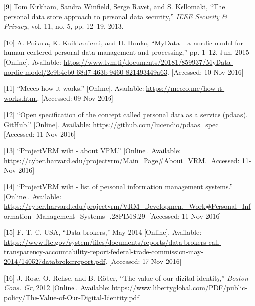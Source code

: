 \documentclass[12pt,english,a4paper,titlepage,cleardoublepage=empty,dottedtoc]{report}
\begin{document}
\hypertarget{ref-paper_2013_the-personal-data-store-approach-to-personal-data-security_2013}{}
{[}9{]} Tom Kirkham, Sandra Winfield, Serge Ravet, and S. Kellomaki,
``The personal data store approach to personal data security,''
\emph{IEEE Security \& Privacy}, vol. 11, no. 5, pp. 12--19, 2013.

\hypertarget{ref-whitepaper_2014_mydata-a-nordic-model-for-human-centered-personal-data-management-and-processing}{}
{[}10{]} A. Poikola, K. Kuikkaniemi, and H. Honko, ``MyData -- a nordic
model for human-centered personal data management and processing,'' pp.
1--12, Jun. 2015 {[}Online{]}. Available:
\url{https://www.lvm.fi/documents/20181/859937/MyData-nordic-model/2e9b4eb0-68d7-463b-9460-821493449a63}.
{[}Accessed: 10-Nov-2016{]}

\hypertarget{ref-web_2016_meeco-how-it-works}{}
{[}11{]} ``Meeco how it works.'' {[}Online{]}. Available:
\url{https://meeco.me/how-it-works.html}. {[}Accessed: 09-Nov-2016{]}

\hypertarget{ref-repo_2016_pdaas-spec}{}
{[}12{]} ``Open specification of the concept called personal data as a
service (pdaas). GitHub.'' {[}Online{]}. Available:
\url{https://github.com/lucendio/pdaas_spec}. {[}Accessed:
11-Nov-2016{]}

\hypertarget{ref-web_2010_projectvrm-wiki_about-vrm}{}
{[}13{]} ``ProjectVRM wiki - about VRM.'' {[}Online{]}. Available:
\url{https://cyber.harvard.edu/projectvrm/Main_Page\#About_VRM}.
{[}Accessed: 11-Nov-2016{]}

\hypertarget{ref-web_2010_projectvrm-wiki_pims-example-list}{}
{[}14{]} ``ProjectVRM wiki - list of personal information management
systems.'' {[}Online{]}. Available:
\url{https://cyber.harvard.edu/projectvrm/VRM_Development_Work\#Personal_Information_Management_Systems_.28PIMS.29}.
{[}Accessed: 11-Nov-2016{]}

\hypertarget{ref-report_2014_data-brokers}{}
{[}15{]} F. T. C. USA, ``Data brokers,'' May 2014 {[}Online{]}.
Available:
\url{https://www.ftc.gov/system/files/documents/reports/data-brokers-call-transparency-accountability-report-federal-trade-commission-may-2014/140527databrokerreport.pdf}.
{[}Accessed: 17-Nov-2016{]}

\hypertarget{ref-whitepaper_2012_the-value-of-our-digital-identity_definition}{}
{[}16{]} J. Rose, O. Rehse, and B. Röber, ``The value of our digital
identity,'' \emph{Boston Cons. Gr}, 2012 {[}Online{]}. Available:
\url{https://www.libertyglobal.com/PDF/public-policy/The-Value-of-Our-Digital-Identity.pdf}
\end{document}
